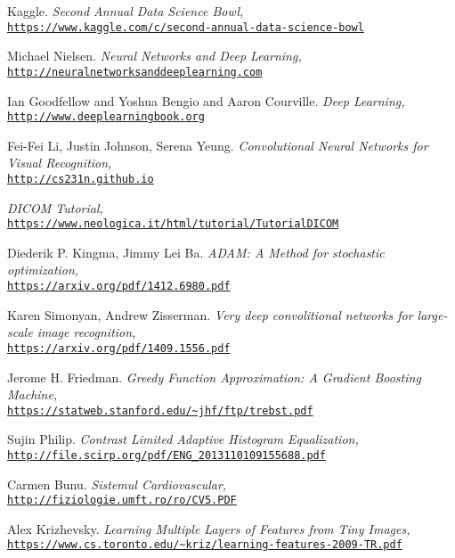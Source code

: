 \begin{thebibliography}{9} 

Kaggle. \textit{Second Annual Data Science Bowl,}
\\\texttt{\url{https://www.kaggle.com/c/second-annual-data-science-bowl}}

Michael Nielsen. \textit{Neural Networks and Deep Learning,}
\\\texttt{\url{http://neuralnetworksanddeeplearning.com}}

Ian Goodfellow and Yoshua Bengio and Aaron Courville. \textit{Deep Learning,}
\\\texttt{\url{http://www.deeplearningbook.org}}

Fei-Fei Li, Justin Johnson, Serena Yeung. \textit{Convolutional Neural Networks for Visual Recognition,}
\\\texttt{\url{http://cs231n.github.io}}

\textit{DICOM Tutorial,}
\\\texttt{\url{https://www.neologica.it/html/tutorial/TutorialDICOM}}

Diederik P. Kingma, Jimmy Lei Ba. \textit{ADAM: A Method for stochastic optimization,}
\\\texttt{\url{https://arxiv.org/pdf/1412.6980.pdf}}

Karen Simonyan, Andrew Zisserman. \textit{Very deep convolitional networks for large-scale image recognition,}
\\\texttt{\url{https://arxiv.org/pdf/1409.1556.pdf}}

Jerome H. Friedman. \textit{Greedy Function Approximation: A Gradient Boosting Machine,}
\\\texttt{\url{https://statweb.stanford.edu/~jhf/ftp/trebst.pdf}}

Sujin Philip. \textit{Contrast Limited Adaptive Histogram Equalization,}
\\\texttt{\url{http://file.scirp.org/pdf/ENG_2013110109155688.pdf}}

Carmen Bunu. \textit{Sistemul Cardiovascular,}
\\\texttt{\url{http://fiziologie.umft.ro/ro/CV5.PDF}}

Alex Krizhevsky. \textit{Learning Multiple Layers of Features from Tiny Images,}
\\\texttt{\url{https://www.cs.toronto.edu/~kriz/learning-features-2009-TR.pdf}}


\end{thebibliography}
